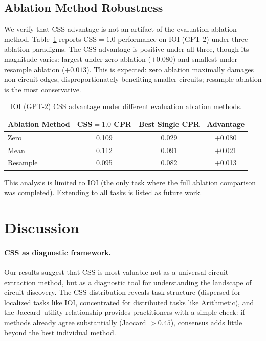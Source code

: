 \documentclass[11pt,a4paper]{article}
\newcommand{\css}{\textsc{CSS}}
\begin{document}
\subsection{Ablation Method Robustness}
\label{sec:ablation_robust}

We verify that \css{} advantage is not an artifact of the evaluation ablation method.
Table~\ref{tab:ablation_method} reports \css{}$=1.0$ performance on IOI (GPT-2) under three ablation paradigms.
The \css{} advantage is positive under all three, though its magnitude varies: largest under zero ablation ($+0.080$) and smallest under resample ablation ($+0.013$).
This is expected: zero ablation maximally damages non-circuit edges, disproportionately benefiting smaller circuits; resample ablation is the most conservative.

\begin{table}[t]
\centering
\small
\caption{IOI (GPT-2) \css{} advantage under different evaluation ablation methods.}
\label{tab:ablation_method}
\begin{tabular}{@{}lccc@{}}
\toprule
Ablation Method & \css{}$=1.0$ CPR & Best Single CPR & Advantage \\
\midrule
Zero & 0.109 & 0.029 & $+$0.080 \\
Mean & 0.112 & 0.091 & $+$0.021 \\
Resample & 0.095 & 0.082 & $+$0.013 \\
\bottomrule
\end{tabular}
\end{table}

This analysis is limited to IOI (the only task where the full ablation comparison was completed).
Extending to all tasks is listed as future work.

\section{Discussion}
\label{sec:discussion}

\paragraph{CSS as diagnostic framework.}
Our results suggest that \css{} is most valuable not as a universal circuit extraction method, but as a diagnostic tool for understanding the landscape of circuit discovery.
The \css{} distribution reveals task structure (dispersed for localized tasks like IOI, concentrated for distributed tasks like Arithmetic), and the Jaccard--utility relationship provides practitioners with a simple check: if methods already agree substantially (Jaccard $> 0.45$), consensus adds little beyond the best individual method.
\end{document}
